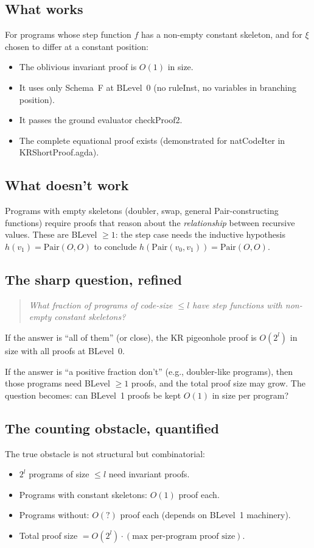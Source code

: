 \documentclass[11pt]{article}
\begin{document}
\subsection{What works}
For programs whose step function $f$ has a non-empty constant skeleton,
and for $\xi$ chosen to differ at a constant position:
\begin{itemize}
\item The oblivious invariant proof is $O(1)$ in size.
\item It uses only Schema~F at BLevel~0 (no ruleInst, no variables in branching position).
\item It passes the ground evaluator checkProof2.
\item The complete equational proof exists (demonstrated for natCodeIter in KRShortProof.agda).
\end{itemize}

\subsection{What doesn't work}
Programs with empty skeletons (doubler, swap, general Pair-constructing functions)
require proofs that reason about the \emph{relationship} between recursive values.
These are BLevel $\geq 1$: the step case needs the inductive hypothesis
$h(v_1) = \mathrm{Pair}(O,O)$ to conclude $h(\mathrm{Pair}(v_0, v_1)) = \mathrm{Pair}(O,O)$.

\subsection{The sharp question, refined}
\begin{quote}
\emph{What fraction of programs of code-size $\leq l$ have step functions
with non-empty constant skeletons?}
\end{quote}

If the answer is ``all of them'' (or close), the KR pigeonhole proof
is $O(2^l)$ in size with all proofs at BLevel~0.

If the answer is ``a positive fraction don't'' (e.g., doubler-like programs),
then those programs need BLevel $\geq 1$ proofs, and the total proof size
may grow. The question becomes: can BLevel~1 proofs be kept $O(1)$ in size
per program?

\subsection{The counting obstacle, quantified}
The true obstacle is not structural but combinatorial:
\begin{itemize}
\item $2^l$ programs of size $\leq l$ need invariant proofs.
\item Programs with constant skeletons: $O(1)$ proof each.
\item Programs without: $O(?)$ proof each (depends on BLevel~1 machinery).
\item Total proof size $= O(2^l) \cdot (\text{max per-program proof size})$.
\end{itemize}
\end{document}
